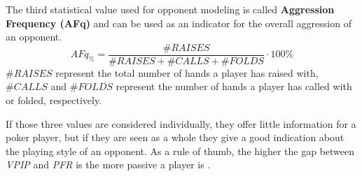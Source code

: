 The third statistical value used for opponent modeling is called \textbf{Aggression Frequency (AFq)} and can be used as an indicator for the overall aggression of an opponent. 
\begin{equation}
\label{eq:afq}
AFq_{\%} = \frac{\#RAISES}{\#RAISES + \#CALLS + \#FOLDS}  \cdot 100\%
\end{equation}
$\#RAISES$ represent the total number of hands a player has raised with, $\#CALLS$ and $\#FOLDS$ represent the number of hands a player has called with or folded, respectively. \par
If those three values are considered individually, they offer little information for a poker player, but if they are seen as a whole they give a good indication about the playing style of an opponent. As a rule of thumb, the higher the gap between \textit{VPIP} and \textit{PFR} is the more passive a player is \cite{playing_style}. 
